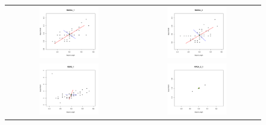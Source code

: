 \documentclass[ss]{imsart}
\theoremstyle{Example}
\begin{document}
\begin{figure}
\begin{center}
\begin{tabular}{cc}
\includegraphics[width=0.49\textwidth]{./RobustPCA_Figures/Iris_Sepal_PCA_Out_MatDec1} &
\includegraphics[width=0.49\textwidth]{./RobustPCA_Figures/Iris_Sepal_PCA_Out_MatDec2} \\
\includegraphics[width=0.49\textwidth]{./RobustPCA_Figures/Iris_Sepal_PCA_Out_RSVD}  &
\includegraphics[width=0.49\textwidth]{./RobustPCA_Figures/Iris_Sepal_PCA_Out_C1} \\

\end{tabular}
\end{center}
\end{figure}
\end{document}
